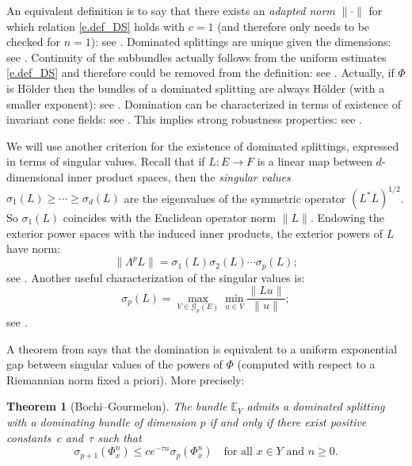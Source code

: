 \documentclass[JEP,XML,SOM,Unicode]{cedram}
\let\mathcal\mathscr
\theoremstyle{plain}
\newtheorem{theorem}{Theorem}[section]
\theoremstyle{definition}
\newcommand{\EE}{\mathbb{E}}
\newcommand{\cG}{\mathcal{G}}
\newcommand{\WEDGE}{\mathsf{\Lambda}}
\begin{document}
An equivalent definition is to say that there exists an \emph{adapted norm} $\| \mathord{\cdot} \|$ for which relation \eqref{e.def_DS} holds with $c=1$ (and therefore only needs to be checked for $n=1$): see \cite{Gourmelon}. Dominated splittings are unique given the dimensions: see \cite[Prop.\,2.2]{CroPo}. Continuity of the subbundles actually follows from the uniform estimates \eqref{e.def_DS} and therefore could be removed from the definition: see \cite[Prop.\,2.5]{CroPo}. Actually, if $\Phi$ is Hölder then the bundles of a dominated splitting are always Hölder (with a smaller exponent): see \cite[Th.\,4.11]{CroPo}.
Domination can be characterized in terms of existence of invariant cone fields: see \cite[Th.\,2.6]{CroPo}.
This implies strong robustness properties: see \cite[Cor.\,2.8]{CroPo}.

We will use another criterion for the existence of dominated splittings, expressed in terms of singular values.
Recall that if $L \colon E \to F$ is a linear map between $d$\nobreakdash-dimensional inner product spaces, then the \emph{singular values} $\sigma_1 (L) \ge \cdots \ge \sigma_d (L)$ are the eigenvalues of the symmetric operator $(L^* L)^{1/2}$. So $\sigma_1(L)$ coincides with the Euclidean operator norm $\|L\|$.
Endowing the exterior power spaces with the induced inner products, the exterior powers of $L$ have norm:
\begin{equation}\label{e.singular_wedge}
\| \WEDGE^p L \| = \sigma_1(L) \sigma_2(L) \cdots \sigma_p(L) ;
\end{equation}
see \eg \cite[p.\,120]{Arnold}.
Another useful characterization of the singular values is:
\begin{equation}\label{e.maxmin}
\sigma_p(L) = \max_{V \in \cG_p(E)} \min_{u \in V} \frac{\|L u\|}{\|u\|} ;
\end{equation}
see \eg \cite[p.\,68]{Stewart}.

A theorem from \cite{BG} says that the domination is equivalent to a uniform exponential gap between singular values of the powers of $\Phi$ (computed with respect to a Riemannian norm fixed a priori).
More precisely:

\begin{theorem}[Bochi--Gourmelon]\label{t.BG}
The bundle $\EE_Y$ admits a dominated splitting with a dominating bundle of dimension $p$ if and only if there exist positive constants~$c$ and~$\tau$ such that
\[
\sigma_{p+1}(\Phi_x^n) \le c e^{-\tau n} \sigma_p(\Phi_x^n) \quad \text{for all $x \in Y$ and $n \ge 0$.}
\]
\end{theorem}
\end{document}
